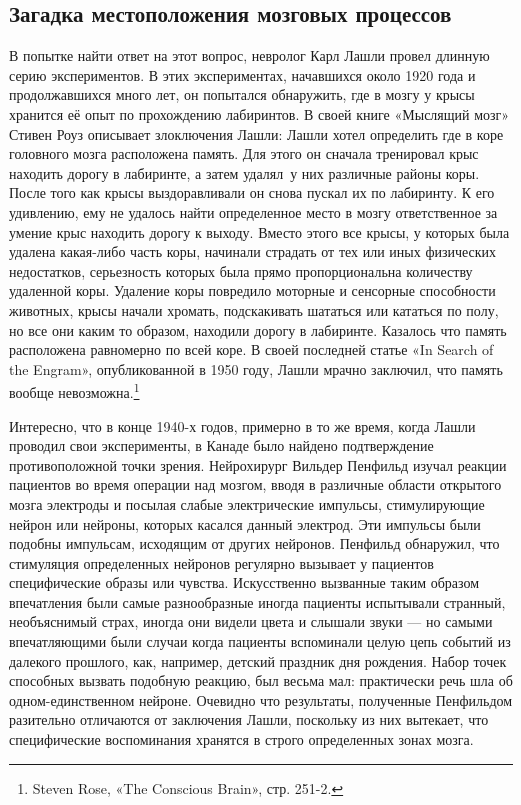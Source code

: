 \documentclass[../main.tex]{subfiles}
\begin{document}
\subsection{Загадка местоположения мозговых процессов}

В попытке найти ответ на этот вопрос, невролог Карл Лашли провел длинную серию экспериментов. В этих экспериментах, начавшихся около 1920 года и продолжавшихся много лет, он попытался обнаружить, где в мозгу у крысы хранится её опыт по прохождению лабиринтов. В своей книге «Мыслящий мозг» Стивен Роуз описывает злоключения Лашли:
Лашли хотел определить где в коре головного мозга расположена память. Для этого он сначала тренировал крыс находить дорогу в лабиринте, а затем удалял~у них различные районы коры. После того как крысы выздоравливали он снова пускал их по лабиринту. К его удивлению, ему не удалось найти определенное место в мозгу ответственное за умение крыс находить дорогу к выходу. Вместо этого все крысы, у которых была удалена какая-либо часть коры, начинали страдать от тех или иных физических недостатков, серьезность которых была прямо пропорциональна количеству удаленной коры. Удаление коры повредило моторные и сенсорные способности животных, крысы начали хромать, подскакивать шататься или кататься по полу, но все они каким то образом, находили дорогу в лабиринте. Казалось что память расположена равномерно по всей коре. В своей последней статье «In Search of the Engram», опубликованной в 1950 году, Лашли мрачно заключил, что память вообще невозможна.\footnote{Steven Rose, «The Conscious Brain», стр. 251-2.}

Интересно, что в конце 1940-х годов, примерно в то же время, когда Лашли проводил свои эксперименты, в Канаде было найдено подтверждение противоположной точки зрения. Нейрохирург Вильдер Пенфильд изучал реакции пациентов во время операции над мозгом, вводя в различные области открытого мозга электроды и посылая слабые электрические импульсы, стимулирующие нейрон или нейроны, которых касался данный электрод. Эти импульсы были подобны импульсам, исходящим от других нейронов. Пенфильд обнаружил, что стимуляция определенных нейронов регулярно вызывает у пациентов специфические образы или чувства. Искусственно вызванные таким образом впечатления были самые разнообразные иногда пациенты испытывали странный, необъяснимый страх, иногда они видели цвета и слышали звуки --- но самыми впечатляющими были случаи когда пациенты вспоминали целую цепь событий из далекого прошлого, как, например, детский праздник дня рождения. Набор точек способных вызвать подобную реакцию, был весьма мал: практически речь шла об одном-единственном нейроне. Очевидно что результаты, полученные Пенфильдом разительно отличаются от заключения Лашли, поскольку из них вытекает, что специфические воспоминания хранятся в строго определенных зонах мозга.
\end{document}
